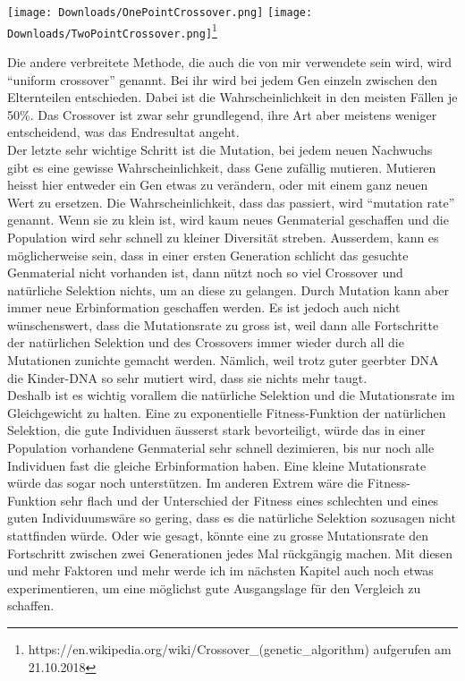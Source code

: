 \documentclass[11pt,a4paper,ngerman]{article}
\begin{document}
\begin{center}
\texttt{[image: Downloads/OnePointCrossover.png]}
\texttt{[image: Downloads/TwoPointCrossover.png]}\footnote{https://en.wikipedia.org/wiki/Crossover\_(genetic\_algorithm) aufgerufen am 21.10.2018}
\end{center}

Die andere verbreitete Methode, die auch die von mir verwendete sein wird, wird \enquote{uniform crossover} genannt. Bei ihr wird bei jedem Gen einzeln zwischen den Elternteilen entschieden. Dabei ist die Wahrscheinlichkeit in den meisten Fällen je 50\%. Das Crossover ist zwar sehr grundlegend, ihre Art aber meistens weniger entscheidend, was das Endresultat angeht.\\

Der letzte sehr wichtige Schritt ist die Mutation, bei jedem neuen Nachwuchs gibt es eine gewisse Wahrscheinlichkeit, dass Gene zufällig mutieren. Mutieren heisst hier entweder ein Gen etwas zu verändern, oder mit einem ganz neuen Wert zu ersetzen. Die Wahrscheinlichkeit, dass das passiert, wird \enquote{mutation rate} genannt. Wenn sie zu klein ist, wird kaum neues Genmaterial geschaffen und die Population wird sehr schnell zu kleiner Diversität streben. Ausserdem, kann es möglicherweise sein, dass in einer ersten Generation schlicht das gesuchte Genmaterial nicht vorhanden ist, dann nützt noch so viel Crossover und natürliche Selektion nichts, um an diese zu gelangen. Durch Mutation kann aber immer neue Erbinformation geschaffen werden. Es ist jedoch auch nicht wünschenswert, dass die Mutationsrate zu gross ist, weil dann alle Fortschritte der natürlichen Selektion und des Crossovers immer wieder durch all die Mutationen zunichte gemacht werden. Nämlich, weil trotz guter geerbter DNA die Kinder-DNA so sehr mutiert wird, dass sie nichts mehr taugt.\\

Deshalb ist es wichtig vorallem die natürliche Selektion und die Mutationsrate im Gleichgewicht zu halten. Eine zu exponentielle Fitness-Funktion der natürlichen Selektion, die gute Individuen äusserst stark bevorteiligt, würde das in einer Population vorhandene Genmaterial sehr schnell dezimieren, bis nur noch alle Individuen fast die gleiche Erbinformation haben. Eine kleine Mutationsrate würde das sogar noch unterstützen. Im anderen Extrem wäre die Fitness-Funktion sehr flach und der Unterschied der Fitness eines schlechten und eines guten Individuumswäre so gering, dass es die natürliche Selektion sozusagen nicht stattfinden würde. Oder wie gesagt, könnte eine zu grosse Mutationsrate den Fortschritt zwischen zwei Generationen jedes Mal rückgängig machen. Mit diesen und mehr Faktoren und mehr werde ich im nächsten Kapitel auch noch etwas experimentieren, um eine möglichst gute Ausgangslage für den Vergleich zu schaffen.
\end{document}
